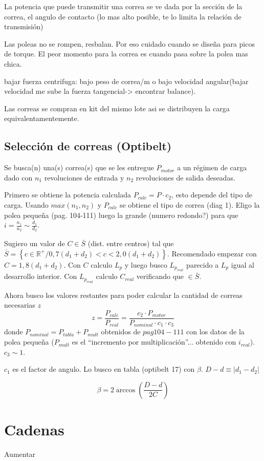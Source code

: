 \documentclass[twocolumn,10pt]{article}
\begin{document}
La potencia que puede transmitir una correa se ve dada por la sección de la correa, el angulo de contacto (lo mas alto posible, te lo limita la relación de transmisión)

Las poleas no se rompen, resbalan. Por eso cuidado cuando se diseña para picos de torque. El peor momento para la correa es cuando pasa sobre la polea mas chica.

bajar fuerza centrifuga: bajo peso de correa/m o bajo velocidad angular(bajar velocidad me sube la fuerza tangencial-> encontrar balance).

Las correas se compran en kit del mismo lote asi se distribuyen la carga equivalentamentemente.
\subsection{Selección de correas (Optibelt)}
Se busca(n) una(s) correa(s) que se les entregue $P_{motor}$ a un régimen de carga dado con $n_1$ revoluciones de entrada y $n_2$ revoluciones de salida deseadas. 

Primero se obtiene la potencia calculada $P_{calc}=P\cdot c_2$, esto depende del tipo de carga. Usando $max(n_1,n_2)$ y $P_{calc}$ se obtiene el tipo de correa (diag 1). Eligo la polea pequeña (pag. 104-111) luego la grande (numero redondo?) para que $i=\frac{n_1}{n_2}\sim \frac{d_1}{d_2}$. 

Sugiero un valor de $C\in \bar{S}$ (dist. entre centros) tal que $\bar{S}=\left \{  c\in \mathbb{R}^+ / 0,7(d_1+d_2)<c<2,0(d_1+d_2) \right \}$. Recomendado empezar con $C=1,8(d_1+d_2)$. Con $C$ calculo $L_p$ y luego busco $L_{p_{real}}$ parecido a $L_p$ igual al desarrollo interior. Con $L_{p_{real}}$ calculo $C_{real}$ verificando que $\in\bar{S}$.

Ahora busco los valores restantes para poder calcular la cantidad de correas necesarias $z$
$$z=\frac{P_{calc} }{P_{real}}=\frac{c_2\cdot P_{motor}}{P_{nominal}\cdot c_1 \cdot c_3} $$
donde $P_{nominal}=P_{tabla}+P_{mult}$ obtenidos de $pag 104-111$ con los datos de la polea pequeña ($P_{mult}$ es el ``incremento por multiplicación''... obtenido con $i_{real}$). $c_3\sim 1$.

$c_1$ es el factor de angulo. Lo busco en tabla (optibelt 17) con $\beta$. $D-d\equiv |d_1-d_2|$

$$\beta =2\arccos\left( \frac{D-d}{2C}\right) $$


\section{Cadenas}
Aumentar
\end{document}
